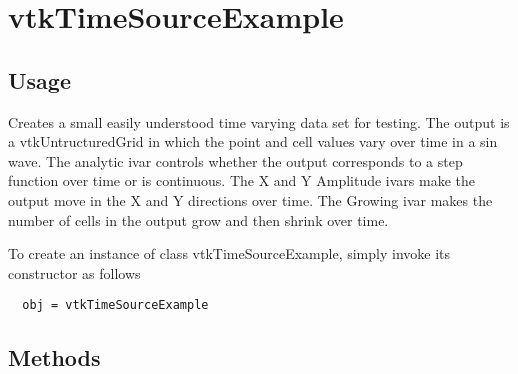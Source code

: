 \section{vtkTimeSourceExample}

\subsection{Usage}

 Creates a small easily understood time varying data set for testing.
 The output is a vtkUntructuredGrid in which the point and cell values vary
 over time in a sin wave. The analytic ivar controls whether the output 
 corresponds to a step function over time or is continuous.
 The X and Y Amplitude ivars make the output move in the X and Y directions 
 over time. The Growing ivar makes the number of cells in the output grow 
 and then shrink over time.

To create an instance of class vtkTimeSourceExample, simply
invoke its constructor as follows
\begin{verbatim}
  obj = vtkTimeSourceExample
\end{verbatim}
\subsection{Methods}

